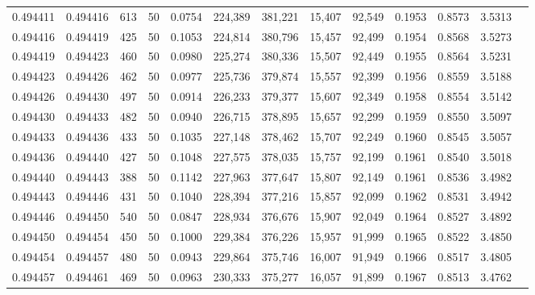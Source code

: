 \begin{tabular}{rrrrrrrrrrrrr}
0.494411 & 0.494416 &   613 &  50 &                                     0.0754 & 224,389 & 381,221 &  15,407 &  92,549 & 0.1953 & 0.8573 & 3.5313 \\
0.494416 & 0.494419 &   425 &  50 &                                     0.1053 & 224,814 & 380,796 &  15,457 &  92,499 & 0.1954 & 0.8568 & 3.5273 \\
0.494419 & 0.494423 &   460 &  50 &                                     0.0980 & 225,274 & 380,336 &  15,507 &  92,449 & 0.1955 & 0.8564 & 3.5231 \\
0.494423 & 0.494426 &   462 &  50 &                                     0.0977 & 225,736 & 379,874 &  15,557 &  92,399 & 0.1956 & 0.8559 & 3.5188 \\
0.494426 & 0.494430 &   497 &  50 &                                     0.0914 & 226,233 & 379,377 &  15,607 &  92,349 & 0.1958 & 0.8554 & 3.5142 \\
0.494430 & 0.494433 &   482 &  50 &                                     0.0940 & 226,715 & 378,895 &  15,657 &  92,299 & 0.1959 & 0.8550 & 3.5097 \\
0.494433 & 0.494436 &   433 &  50 &                                     0.1035 & 227,148 & 378,462 &  15,707 &  92,249 & 0.1960 & 0.8545 & 3.5057 \\
0.494436 & 0.494440 &   427 &  50 &                                     0.1048 & 227,575 & 378,035 &  15,757 &  92,199 & 0.1961 & 0.8540 & 3.5018 \\
0.494440 & 0.494443 &   388 &  50 &                                     0.1142 & 227,963 & 377,647 &  15,807 &  92,149 & 0.1961 & 0.8536 & 3.4982 \\
0.494443 & 0.494446 &   431 &  50 &                                     0.1040 & 228,394 & 377,216 &  15,857 &  92,099 & 0.1962 & 0.8531 & 3.4942 \\
0.494446 & 0.494450 &   540 &  50 &                                     0.0847 & 228,934 & 376,676 &  15,907 &  92,049 & 0.1964 & 0.8527 & 3.4892 \\
0.494450 & 0.494454 &   450 &  50 &                                     0.1000 & 229,384 & 376,226 &  15,957 &  91,999 & 0.1965 & 0.8522 & 3.4850 \\
0.494454 & 0.494457 &   480 &  50 &                                     0.0943 & 229,864 & 375,746 &  16,007 &  91,949 & 0.1966 & 0.8517 & 3.4805 \\
0.494457 & 0.494461 &   469 &  50 &                                     0.0963 & 230,333 & 375,277 &  16,057 &  91,899 & 0.1967 & 0.8513 & 3.4762 \\

\end{tabular}
